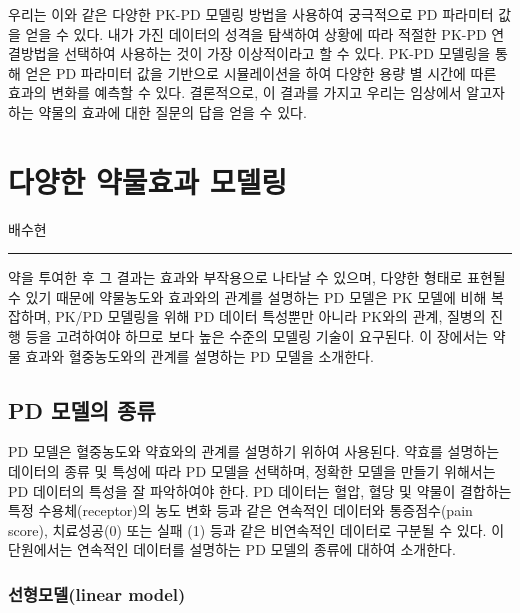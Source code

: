 \documentclass[
  11pt,
  krantz2,
  a4paper]{krantz}
\theoremstyle{definition}
\theoremstyle{definition}
\theoremstyle{definition}
\theoremstyle{remark}
\begin{document}
우리는 이와 같은 다양한 PK-PD 모델링 방법을 사용하여 궁극적으로 PD 파라미터 값을 얻을 수 있다. 내가 가진 데이터의 성격을 탐색하여 상황에 따라 적절한 PK-PD 연결방법을 선택하여 사용하는 것이 가장 이상적이라고 할 수 있다. PK-PD 모델링을 통해 얻은 PD 파라미터 값을 기반으로 시뮬레이션을 하여 다양한 용량 별 시간에 따른 효과의 변화를 예측할 수 있다. 결론적으로, 이 결과를 가지고 우리는 임상에서 알고자 하는 약물의 효과에 대한 질문의 답을 얻을 수 있다.

\hypertarget{effect-model}{%
\chapter{다양한 약물효과 모델링}\label{effect-model}}

\Large\hfill

배수현
\normalsize

\begin{center}\rule{0.5\linewidth}{0.5pt}\end{center}

약을 투여한 후 그 결과는 효과와 부작용으로 나타날 수 있으며, 다양한 형태로 표현될 수 있기 때문에 약물농도와 효과와의 관계를 설명하는 PD 모델은 PK 모델에 비해 복잡하며, PK/PD 모델링을 위해 PD 데이터 특성뿐만 아니라 PK와의 관계, 질병의 진행 등을 고려하여야 하므로 보다 높은 수준의 모델링 기술이 요구된다. 이 장에서는 약물 효과와 혈중농도와의 관계를 설명하는 PD 모델을 소개한다.

\hypertarget{pd-model}{%
\section{PD 모델의 종류}\label{pd-model}}

PD 모델은 혈중농도와 약효와의 관계를 설명하기 위하여 사용된다. 약효를 설명하는 데이터의 종류 및 특성에 따라 PD 모델을 선택하며, 정확한 모델을 만들기 위해서는 PD 데이터의 특성을 잘 파악하여야 한다. PD 데이터는 혈압, 혈당 및 약물이 결합하는 특정 수용체(receptor)의 농도 변화 등과 같은 연속적인 데이터와 통증점수(pain score), 치료성공(0) 또는 실패 (1) 등과 같은 비연속적인 데이터로 구분될 수 있다. 이 단원에서는 연속적인 데이터를 설명하는 PD 모델의 종류에 대하여 소개한다.

\hypertarget{uxc120uxd615uxbaa8uxb378linear-model}{%
\subsection{선형모델(linear model)}\label{uxc120uxd615uxbaa8uxb378linear-model}}
\end{document}
